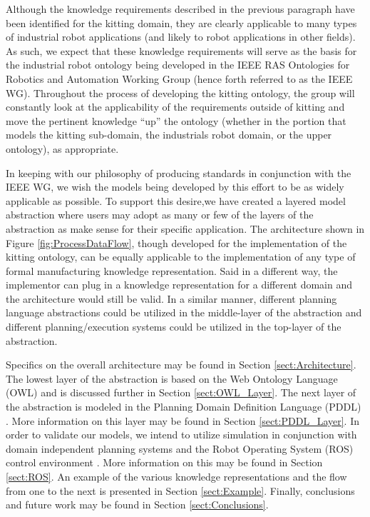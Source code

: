 \documentclass[a4paper, 10pt, conference]{ieeeconf}      %
\begin{document}
Although the knowledge requirements described in the previous paragraph have been identified for the kitting domain, they are clearly applicable to many types of industrial robot applications (and likely to robot applications in other fields). As such, we expect that these knowledge requirements will serve as the basis for the industrial robot ontology being developed in the IEEE  RAS Ontologies for Robotics and Automation Working Group \cite{Madhavan2011} (hence forth referred to as the IEEE WG). Throughout the process of developing the kitting ontology, the group will constantly look at the applicability of the requirements outside of kitting and move the pertinent knowledge ``up'' the ontology (whether in the portion that models the kitting sub-domain, the industrials robot domain, or the upper ontology), as appropriate.

In keeping with our philosophy of producing standards in conjunction with the IEEE WG, we wish the models being developed by this effort to be as widely applicable as possible. To support this desire,we have
created a layered model abstraction where users may adopt as many or few of the layers of the abstraction as make sense for their
specific application.  The architecture shown in Figure \ref{fig:ProcessDataFlow}, though developed for the implementation of the kitting ontology, can be equally applicable to the implementation of any type of formal manufacturing knowledge representation. Said in a different way, the implementor can plug in a knowledge representation for a different domain and the architecture would still be valid. In a similar manner, different planning language abstractions could be utilized in the middle-layer of the 
abstraction and different planning/execution systems could be utilized in the top-layer of the abstraction. 

Specifics on the overall architecture may be found in Section \ref{sect:Architecture}. The lowest layer of the abstraction
is based on 
the Web Ontology Language (OWL) \cite{OWL} and is discussed further in Section \ref{sect:OWL_Layer}. The next layer of the 
abstraction is
modeled in the Planning Domain Definition Language (PDDL) \cite{PDDL}. More information on this layer may be found in Section
\ref{sect:PDDL_Layer}. In order to validate our models, we intend to utilize simulation in conjunction with  domain independent planning
systems and the Robot
Operating System (ROS) control environment \cite{ROS}. More information on this may be found in Section \ref{sect:ROS}. An example of the
various knowledge representations and the flow from one to the next is presented in Section \ref{sect:Example}. Finally,
conclusions and future work may be found in Section \ref{sect:Conclusions}.
\end{document}
